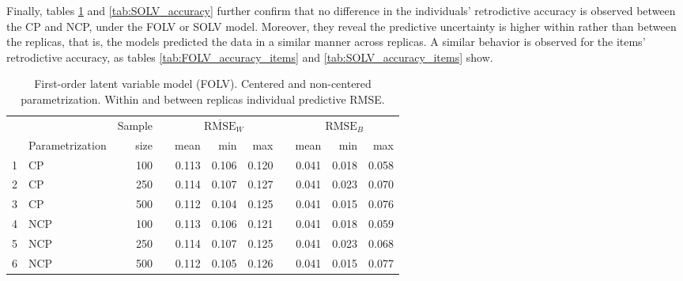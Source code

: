 Finally, tables \ref{tab:FOLV_accuracy} and \ref{tab:SOLV_accuracy} further confirm that no difference in the individuals' retrodictive accuracy is observed between the CP and NCP, under the FOLV or SOLV model. Moreover, they reveal the predictive uncertainty is higher within rather than between the replicas, that is, the models predicted the data in a similar manner across replicas. A similar behavior is observed for the items' retrodictive accuracy, as tables \ref{tab:FOLV_accuracy_items} and \ref{tab:SOLV_accuracy_items} show.
%
\begin{table}[H]
	\centering
	\begin{tabular}{rlrrrrrrrrr}
		\hline
		& & Sample && \multicolumn{3}{c}{ $\overline{\text{RMSE}}_{W}$ } && \multicolumn{3}{c}{ $\text{RMSE}_{B}$ } \\
		\cmidrule(rl){5-7} \cmidrule(rl){9-11}  
		& Parametrization & size  && mean & min & max && mean & min & max \\ 
		\hline\hline
		1 & CP & 100 && 0.113 & 0.106 & 0.120 && 0.041 & 0.018 & 0.058 \\ 
		2 & CP & 250 && 0.114 & 0.107 & 0.127 && 0.041 & 0.023 & 0.070 \\
		3 & CP & 500 && 0.112 & 0.104 & 0.125 && 0.041 & 0.015 & 0.076 \\
		\hline
		4 & NCP & 100 && 0.113 & 0.106 & 0.121 && 0.041 & 0.018 & 0.059 \\ 
		5 & NCP & 250 && 0.114 & 0.107 & 0.125 && 0.041 & 0.023 & 0.068 \\ 
		6 & NCP & 500 && 0.112 & 0.105 & 0.126 && 0.041 & 0.015 & 0.077 \\
		\hline
	\end{tabular}
	\caption[First-order latent variable model (FOLV). Centered and non-centered parametrization. Within and between replicas individual predictive RMSE.]%
	{First-order latent variable model (FOLV). Centered and non-centered parametrization. Within and between replicas individual predictive RMSE.}
	\label{tab:FOLV_accuracy}
\end{table}
%
